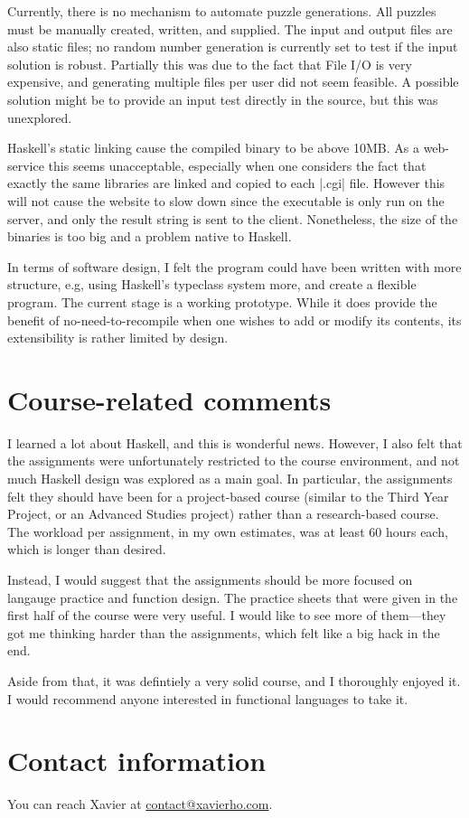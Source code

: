 \documentclass[a4paper]{article}
\begin{document}
Currently, there is no mechanism to automate puzzle generations. All puzzles must be manually created, written, and supplied.  The input and output files are also static files; no random number generation is currently set to test if the input solution is robust.  Partially this was due to the fact that File I/O is very expensive, and generating multiple files per user did not seem feasible.  A possible solution might be to provide an input test directly in the source, but this was unexplored.

Haskell's static linking cause the compiled binary to be above 10MB.  As a web-service this seems unacceptable, especially when one considers the fact that exactly the same libraries are linked and copied to each |.cgi| file.  However this will not cause the website to slow down since the executable is only run on the server, and only the result string is sent to the client.  Nonetheless, the size of the binaries is too big and a problem native to Haskell.

In terms of software design, I felt the program could have been written with more structure, e.g, using Haskell's typeclass system more, and create a flexible program.  The current stage is a working prototype.  While it does provide the benefit of no-need-to-recompile when one wishes to add or modify its contents, its extensibility is rather limited by design.

\section{Course-related comments}
I learned a lot about Haskell, and this is wonderful news.  However, I also felt that the assignments were unfortunately restricted to the course environment, and not much Haskell design was explored as a main goal.  In particular, the assignments felt they should have been for a project-based course (similar to the Third Year Project, or an Advanced Studies project) rather than a research-based course.  The workload per assignment, in my own estimates, was at least 60 hours each, which is longer than desired.

Instead, I would suggest that the assignments should be more focused on langauge practice and function design.  The practice sheets that were given in the first half of the course were very useful.  I would like to see more of them---they got me thinking harder than the assignments, which felt like a big hack in the end.  

Aside from that, it was defintiely a very solid course, and I thoroughly enjoyed it.  I would recommend anyone interested in functional languages to take it.

\section{Contact information}

You can reach Xavier at \href{mailto:contact@xavierho.com}{contact@xavierho.com}.
\end{document}
